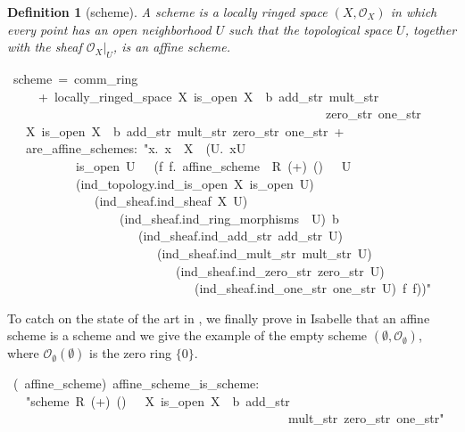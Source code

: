 \documentclass[12pt]{scrartcl}
\newtheorem{definition}[proposition]{Definition}
\begin{document}
\begin{definition}[scheme]
	A scheme is a locally ringed space $(X, \mathscr{O}_X)$ in which every point has an open neighborhood $U$ such that the topological space $U$, together with the sheaf $\mathscr{O}_X | _U$, is an affine scheme.
\end{definition}

\begin{isabelle}
\ scheme\ =\ comm\_ring\ \isanewline
\ \ \ \ \ +\ locally\_ringed\_space\ X\ is\_open\ \isasymO \isactrlsub X\ \isasymrho \ b\ add\_str\ mult\_str\isanewline
\ \ \ \ \ \ \ \ \ \ \ \ \ \ \ \ \ \ \ \ \ \ \ \ \ \ \ \ \ \ \ \ \ \ \ \ \ \ \ \ \ \ \ \ \ \ \ \ \ \ \ zero\_str\ one\_str\ \isanewline
\ \ \ X\ is\_open\ \isasymO \isactrlsub X\ \isasymrho \ b\ add\_str\ mult\_str\ zero\_str\ one\_str\ +\isanewline
\ \ \ are\_affine\_schemes:\ "\isasymAnd x.\ x\ \isasymin \ X\ \isasymLongrightarrow \ (\isasymexists U.\ x\isasymin U\ \isanewline
\ \ \ \ \ \ \ \ \ \ \isasymand \ is\_open\ U\ \isasymand \ \ (\isasymexists f\ \isasymphi \isactrlsub f.\ affine\_scheme\ \ R\ (+)\ (\isasymcdot )\ \isasymzero \ \isasymone \ U\ \isanewline
\ \ \ \ \ \ \ \ \ \ \ (ind\_topology.ind\_is\_open\ X\ is\_open\ U)\isanewline
\ \ \ \ \ \ \ \ \ \ \ \ \ \ (ind\_sheaf.ind\_sheaf\ \isasymO \isactrlsub X\ U)\ \isanewline
\ \ \ \ \ \ \ \ \ \ \ \ \ \ \ \ \ \ (ind\_sheaf.ind\_ring\_morphisms\ \isasymrho \ U)\ b\ \isanewline
\ \ \ \ \ \ \ \ \ \ \ \ \ \ \ \ \ \ \ \ \ (ind\_sheaf.ind\_add\_str\ add\_str\ U)\ \isanewline
\ \ \ \ \ \ \ \ \ \ \ \ \ \ \ \ \ \ \ \ \ \ \ \ (ind\_sheaf.ind\_mult\_str\ mult\_str\ U)\isanewline
\ \ \ \ \ \ \ \ \ \ \ \ \ \ \ \ \ \ \ \ \ \ \ \ \ \ \ (ind\_sheaf.ind\_zero\_str\ zero\_str\ U)\ \isanewline
\ \ \ \ \ \ \ \ \ \ \ \ \ \ \ \ \ \ \ \ \ \ \ \ \ \ \ \ \ \ (ind\_sheaf.ind\_one\_str\ one\_str\ U)\ f\ \isasymphi \isactrlsub f))"
\end{isabelle}
To catch on the state of the art in \cite{schemesinLean}, we finally prove in Isabelle that an affine scheme is a scheme and we give the example of the empty scheme $(\emptyset, \mathscr{O}_\emptyset)$, where $\mathscr{O}_\emptyset(\emptyset)$ is the zero ring $\lbrace 0 \rbrace$. 

\begin{isabelle}
\ (\ affine\_scheme)\ affine\_scheme\_is\_scheme:\isanewline
\ \ \ "scheme\ R\ (+)\ (\isasymcdot )\ \isasymzero \ \isasymone \ X\ is\_open\ \isasymO \isactrlsub X\ \isasymrho \ b\ add\_str\ \isanewline
\ \ \ \ \ \ \ \ \ \ \ \ \ \ \ \ \ \ \ \ \ \ \ \ \ \ \ \ \ \ \ \ \ \ \ \ \ \ \ \ \ \ \ \ \ mult\_str\ zero\_str\ one\_str"
\end{isabelle}
\end{document}
